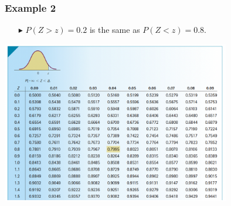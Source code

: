 \documentclass[12pt]{beamer}
\begin{document}
	\begin{frame}
	\frametitle{Example 2}
	\begin{itemize}
		\item[\color{blue}$\blacktriangleright$] $P(Z>z)=0.2$ is the same as $P(Z<z)=0.8$.
	\end{itemize}
	\centering
	\includegraphics[width=10cm]{example2ztable.png}
\end{frame}
\end{document}
